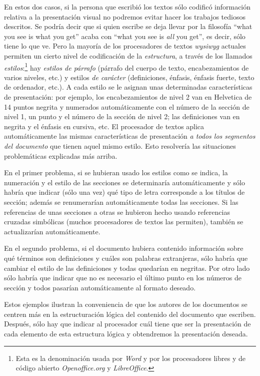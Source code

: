 {En estos dos casos, si la persona que escribió los textos sólo codificó información relativa a la presentación visual no podremos evitar hacer los trabajos tediosos descritos. Se podría decir que si quien escribe se deja llevar por la filosofía ``what you see is what you get'' acaba con ``what you see is \emph{all} you get'', es decir, sólo tiene lo que ve. Pero la mayoría de los procesadores de textos \emph{wysiwyg} actuales permiten un cierto nivel de codificación de  la \emph{estructura}, a través de los llamados \emph{estilos}:\footnote{Esta es la denominación usada por \emph{Word} y por los procesadores libres y de código abierto \emph{Openoffice.org} y  \emph{LibreOffice}.} hay \emph{estilos de párrafo} (párrafo del cuerpo de texto, encabezamientos de varios niveles, etc.) y estilos \emph{de carácter} (definiciones, énfasis, énfasis fuerte, texto de ordenador, etc.).\label{pg:estil} A cada estilo se le asignan unas determinadas características de presentación: por ejemplo, los encabezamientos de nivel 2 van en Helvetica de 14 puntos negrita y numerados automáticamente con el número de la sección de nivel 1, un punto y el número de la sección de nivel 2; las definiciones van en negrita y el énfasis en cursiva, etc. El procesador de textos aplica automáticamente las mismas características de presentación \emph{a todos los segmentos del documento} que tienen aquel mismo estilo. Esto resolvería las situaciones problemáticas explicadas más arriba. 

En el primer problema, si se hubieran usado los estilos como se indica, la numeración y el estilo de las secciones se determinaría automáticamente y sólo habría que indicar (sólo una vez) qué tipo de letra corresponde a los títulos de sección; además se renumerarían automáticamente todas las secciones. Si las referencias de unas secciones a otras se hubieron hecho usando referencias cruzadas simbólicas (muchos procesadores de textos las permiten), también se actualizarían automáticamente. 

En el segundo problema, si el documento hubiera contenido información sobre qué términos son definiciones y cuáles son palabras extranjeras, sólo habría que cambiar el estilo de las definiciones y todas quedarían en negritas. Por otro lado sólo habría que indicar que no es necesario el último punto en los números de sección y todos pasarían automáticamente al formato deseado. 

Estos ejemplos ilustran la conveniencia de que los autores de los documentos se centren más en la estructuración lógica del contenido del documento que escriben. Después, sólo hay que indicar al procesador cuál tiene que ser la presentación de cada elemento de esta estructura lógica y obtendremos la presentación deseada. 

}
